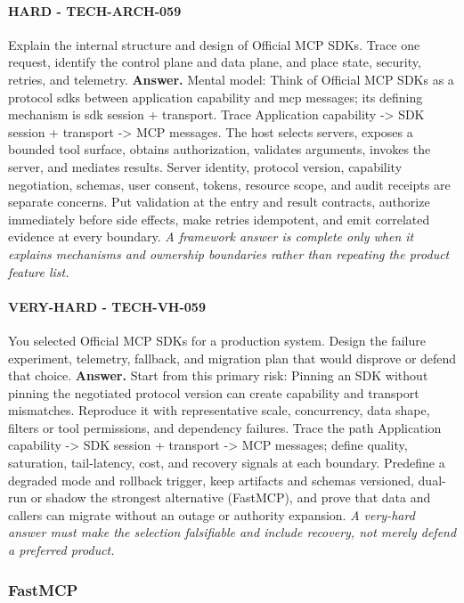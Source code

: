 \paragraph{HARD - TECH-ARCH-059} Explain the internal structure and design of Official MCP SDKs. Trace one request, identify the control plane and data plane, and place state, security, retries, and telemetry.
\textbf{Answer.} Mental model: Think of Official MCP SDKs as a protocol sdks between application capability and mcp messages; its defining mechanism is sdk session + transport. Trace Application capability -> SDK session + transport -> MCP messages. The host selects servers, exposes a bounded tool surface, obtains authorization, validates arguments, invokes the server, and mediates results. Server identity, protocol version, capability negotiation, schemas, user consent, tokens, resource scope, and audit receipts are separate concerns. Put validation at the entry and result contracts, authorize immediately before side effects, make retries idempotent, and emit correlated evidence at every boundary.
\textit{A framework answer is complete only when it explains mechanisms and ownership boundaries rather than repeating the product feature list.}
\paragraph{VERY-HARD - TECH-VH-059} You selected Official MCP SDKs for a production system. Design the failure experiment, telemetry, fallback, and migration plan that would disprove or defend that choice.
\textbf{Answer.} Start from this primary risk: Pinning an SDK without pinning the negotiated protocol version can create capability and transport mismatches. Reproduce it with representative scale, concurrency, data shape, filters or tool permissions, and dependency failures. Trace the path Application capability -> SDK session + transport -> MCP messages; define quality, saturation, tail-latency, cost, and recovery signals at each boundary. Predefine a degraded mode and rollback trigger, keep artifacts and schemas versioned, dual-run or shadow the strongest alternative (FastMCP), and prove that data and callers can migrate without an outage or authority expansion.
\textit{A very-hard answer must make the selection falsifiable and include recovery, not merely defend a preferred product.}
\subsubsection*{FastMCP}
